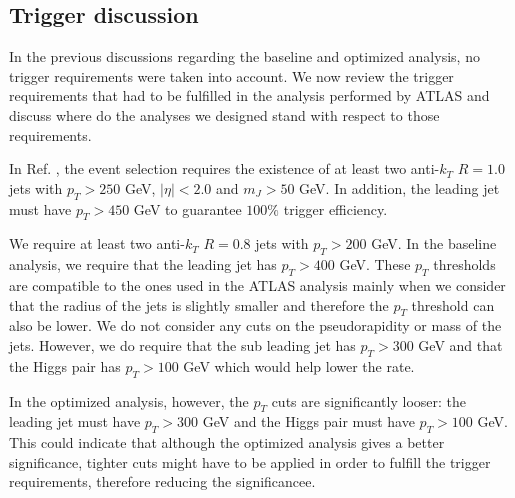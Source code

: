 \subsection{Trigger discussion}

In the previous discussions regarding the baseline and optimized analysis, no trigger requirements were taken into account. We now review the trigger requirements that had to be fulfilled in the analysis performed by ATLAS and discuss where do the analyses we designed stand with respect to those requirements. 

In Ref. \cite{hh2bbbbATLAS1}, the event selection requires the existence of at least two anti-$k_T$ $R=1.0$ jets with $p_T>250$ GeV, $|\eta|<2.0$ and $m_J>50$ GeV. In addition, the leading jet must have $p_T>450$ GeV to guarantee $100\%$ trigger efficiency. 

We require at least two anti-$k_T$ $R=0.8$ jets with $p_T>200$ GeV. In the baseline analysis, we require that the leading jet has $p_T>400$ GeV. These $p_T$ thresholds are compatible to the ones used in the ATLAS analysis mainly when we consider that the radius of the jets is slightly smaller and therefore the $p_T$ threshold can also be lower. We do not consider any cuts on the pseudorapidity or mass of the jets. However, we do require that the sub leading jet has $p_T>300$ GeV and that the Higgs pair has $p_T>100$ GeV which would help lower the rate. 

In the optimized analysis, however, the $p_T$ cuts are significantly looser: the leading jet must have $p_T>300$ GeV and the Higgs pair must have $p_T>100$ GeV. This could indicate that although the optimized analysis gives a better significance, tighter cuts might have to be applied in order to fulfill the trigger requirements, therefore reducing the significancee.

